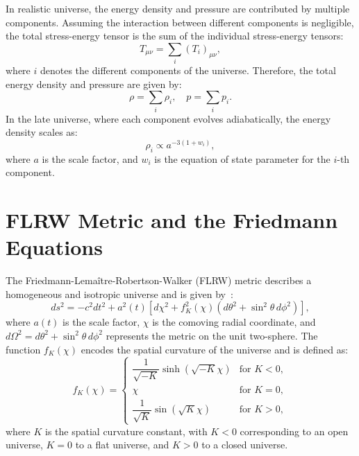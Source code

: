 In realistic universe, the energy density and pressure are contributed by multiple components. Assuming the interaction between different components is negligible, the total stress-energy tensor is the sum of the individual stress-energy tensors:
\begin{equation}
    T_{\mu\nu} = \sum_i (T_i)_{\mu\nu},
\end{equation}
where \( i \) denotes the different components of the universe. Therefore, the total energy density and pressure are given by:
\begin{equation}
    \rho = \sum_i \rho_i, \quad p = \sum_i p_i.
\end{equation}
In the late universe, where each component evolves adiabatically, the energy density scales as:
\begin{equation}
    \rho_i \propto a^{-3(1 + w_i)},
    \label{eq:energy_density_scaling}
\end{equation}
where \( a \) is the scale factor, and \( w_i \) is the equation of state parameter for the \( i \)-th component. 

\section{FLRW Metric and the Friedmann Equations}\label{sec:flrw_metric}
The Friedmann-Lemaître-Robertson-Walker (FLRW) metric describes a homogeneous and isotropic universe and is given by~\citet{1972gcpa.book.....W}:
\begin{equation}
    ds^2 = -c^2 dt^2 + a^2(t) \left[ d\chi^2 + f_K^2(\chi) \left( d\theta^2 + \sin^2\theta \, d\phi^2 \right) \right],
    \label{eq:flrw_metric}
\end{equation}
where \( a(t) \) is the scale factor, \( \chi \) is the comoving radial coordinate, and \( d\Omega^2 = d\theta^2 + \sin^2\theta \, d\phi^2 \) represents the metric on the unit two-sphere. The function \( f_K(\chi) \) encodes the spatial curvature of the universe and is defined as:
\begin{equation}
    f_K(\chi) = 
    \begin{cases}
        \dfrac{1}{\sqrt{-K}} \sinh\left(\sqrt{-K}\chi\right) & \text{for } K < 0, \\
        \chi & \text{for } K = 0, \\
        \dfrac{1}{\sqrt{K}} \sin\left(\sqrt{K}\chi\right) & \text{for } K > 0,
    \end{cases}
    \label{eq:fk_definition}
\end{equation}
where \( K \) is the spatial curvature constant, with \( K < 0 \) corresponding to an open universe, \( K = 0 \) to a flat universe, and \( K > 0 \) to a closed universe.

